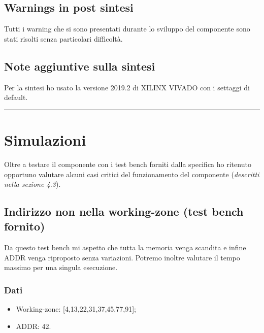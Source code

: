\documentclass{article}
\begin{document}
\subsection{Warnings in post sintesi}
Tutti i warning che si sono presentati durante lo sviluppo del componente sono stati risolti senza particolari difficoltà.
\subsection{Note aggiuntive sulla sintesi}
Per la sintesi ho usato la versione 2019.2 di XILINX VIVADO con i settaggi di default.

\noindent\rule{\textwidth}{0.5pt}
\newpage
\section{Simulazioni}
Oltre a testare il componente con i test bench forniti dalla specifica ho ritenuto opportuno valutare alcuni casi critici del funzionamento del componente (\textit{descritti nella sezione 4.3}).
\subsection{Indirizzo non nella working-zone (test bench fornito)}
Da questo test bench mi aspetto che tutta la memoria venga scandita e infine ADDR venga riproposto senza variazioni.
Potremo inoltre valutare il tempo massimo per una singula esecuzione.
\subsubsection{Dati}
\begin{itemize}
	\item Working-zone: [4,13,22,31,37,45,77,91];
	\item ADDR: 42.
\end{itemize}
\end{document}
